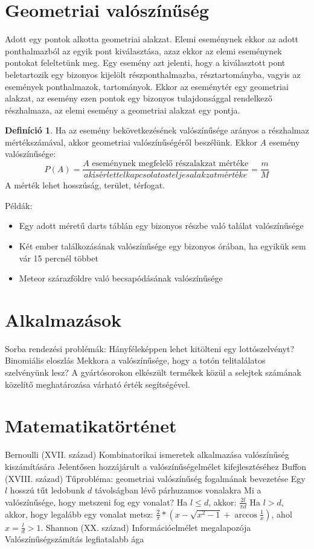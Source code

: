 \documentclass[twoside,12pt]{report}
\theoremstyle{definition}
\newtheorem{definition}[theorem]{Definíció}
\begin{document}
\section{Geometriai valószínűség}
	Adott egy pontok alkotta geometriai alakzat. Elemi eseménynek ekkor az adott ponthalmazból az
	egyik pont kiválasztása, azaz ekkor az elemi eseménynek pontokat feleltetünk meg. Egy esemény
	azt jelenti, hogy a kiválasztott pont beletartozik egy bizonyos kijelölt részponthalmazba, résztartományba, vagyis az események ponthalmazok, tartományok. Ekkor az eseménytér egy geometriai
	alakzat, az esemény ezen pontok egy bizonyos tulajdonsággal rendelkező részhalmaza, az elemi
	esemény a geometriai alakzat egy pontja.
	\begin{definition}
		Ha az esemény bekövetkezésének valószínűsége arányos a részhalmaz mértékszámával,
		akkor geometriai valószínűségéről beszélünk. Ekkor $A$ esemény valószínűsége:
		\begin{equation*}
			P(A)=\frac{\text{$A$ eseménynek megfelelő részalakzat mértéke}}{a kísérlettel kapcsolatos teljes alakzat mértéke}=\frac{m}{M}
		\end{equation*}
		A mérték lehet hosszúság, terület, térfogat.
	\end{definition}
	Példák:
	\begin{itemize}
		\item Egy adott méretű darts táblán egy bizonyos részbe való találat valószínűsége
		\item Két ember találkozásának valószínűsége egy bizonyos órában, ha egyikük sem vár 15 percnél
		többet
		\item Meteor szárazföldre való becsapódásának valószínűsége
	\end{itemize}
\section{Alkalmazások}
	\begin{outline}
		\1 Sorba rendezési problémák:
			\2 Hányféleképpen lehet kitölteni egy lottószelvényt?
		\1 Binomiális eloszlás
			\2 Mekkora a valószínűsége, hogy a totón telitalálatos szelvényünk lesz?
			\2 A gyártósorokon elkészült termékek közül a selejtek számának közelítő meghatározása várható érték segítségével.
	\end{outline}
\section{Matematikatörténet}
	\begin{outline}
		\1 Bernoulli (XVII. század)
			\2 Kombinatorikai ismeretek alkalmazása valószínűség kiszámítására
			\2 Jelentősen hozzájárult a valószínűségelmélet kifejlesztéséhez
		\1 Buffon (XVIII. század)
			\2 Tűprobléma: geometriai valószínűség fogalmának bevezetése
			\2 Egy $l$ hosszú tűt ledobunk $d$ távolságban lévő párhuzamos vonalakra
				\3 Mi a valószínűsége, hogy metszeni fog egy vonalat?
				\3 Ha $l\le d$, akkor: $\frac{2l}{\pi d}$
				\3 Ha $l>d$, akkor, hogy legalább egy vonalat metsz: $\frac{2}{\pi}*\left(x-\sqrt{x^2-1}+\arccos\frac{1}{x}\right)$, ahol $x=\frac{l}{d}>1$.
		\1 Shannon (XX. század)
			\2 Információelmélet megalapozója
				\3 Valószínűségszámítás legfiatalabb ága
	\end{outline}
\end{document}
